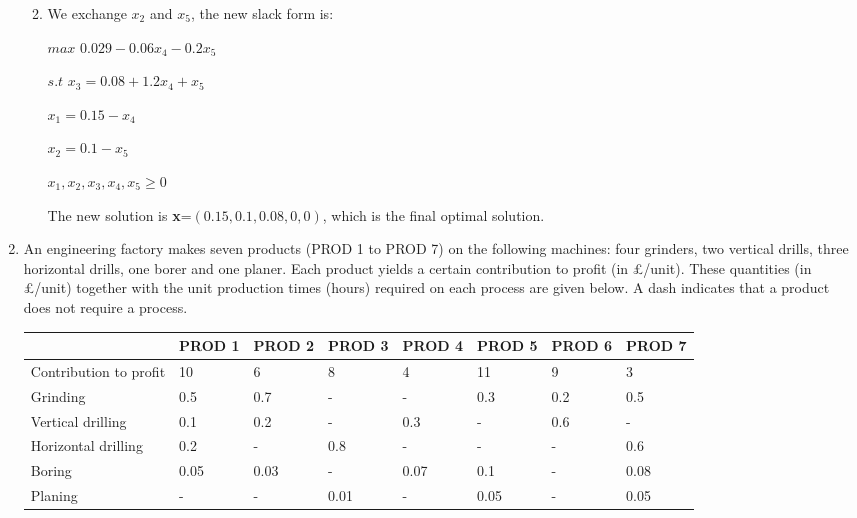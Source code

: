 \documentclass[12pt,a4paper]{article}
\makeatletter
\newtheorem*{solution}{Solution}
\theoremstyle{definition}
\renewenvironment{solution}[1][Solution] {\par\pushQED{\qed}\normalfont\topsep6\p@\@plus6\p@\relax\trivlist\item[\hskip\labelsep\bfseries#1\@addpunct{.}]\ignorespaces}{\popQED\endtrivlist\@endpefalse} \makeatother
\makeatother
\begin{document}
\begin{enumerate}
\begin{enumerate}
\begin{solution}
    	We exchange $x_2$ and $x_5$, the new slack form is:
    	
    		\begin{center}
    		$max$  $0.029-0.06x_4-0.2x_5$
    		
    		$s.t$ $x_3=0.08+1.2x_4+x_5$
    		
    		$x_1=0.15-x_4$
    		
    		$x_2=0.1-x_5$
    		
    		$x_1,x_2,x_3,x_4,x_5\ge0$
    	\end{center}
    
    	The new solution is \textbf{x}=$(0.15,0.1,0.08,0,0)$, which is the final optimal solution.
    \end{solution}
    \end{enumerate}

    \item
    An engineering factory makes seven products (PROD 1 to PROD 7) on the following machines: four grinders, two vertical drills, three horizontal drills, one borer and one planer. Each product yields a certain contribution to profit (in \pounds/unit). These quantities (in \pounds/unit) together with the unit production times (hours) required on each process are given below. A dash indicates that a product does not require a process.

    \begin{table}[htbp]
      \scriptsize
      \centering
      \renewcommand\arraystretch{1.1}
      \begin{tabular}{m{} m{}<{\centering} m{}<{\centering} m{}<{\centering} m{}<{\centering} m{}<{\centering} m{}<{\centering} m{}<{\centering}}
      \hline
       & \textbf{PROD 1} & \textbf{PROD 2} & \textbf{PROD 3} & \textbf{PROD 4} & \textbf{PROD 5} & \textbf{PROD 6} &  \textbf{PROD 7} \\\hline
      Contribution to profit & 10 & 6 & 8 & 4 & 11 & 9 & 3 \\
      Grinding & 0.5 & 0.7 & - & - & 0.3 & 0.2 & 0.5 \\
      Vertical drilling & 0.1 & 0.2 & - & 0.3 & - & 0.6 & - \\
      Horizontal drilling & 0.2 & - & 0.8 & - & - & - & 0.6 \\
      Boring & 0.05 & 0.03 & - & 0.07 & 0.1 & - & 0.08 \\
      Planing & - & - & 0.01 & - & 0.05 & - & 0.05 \\
      \hline
      \end{tabular}
    \end{table}


\end{enumerate}
\end{document}
